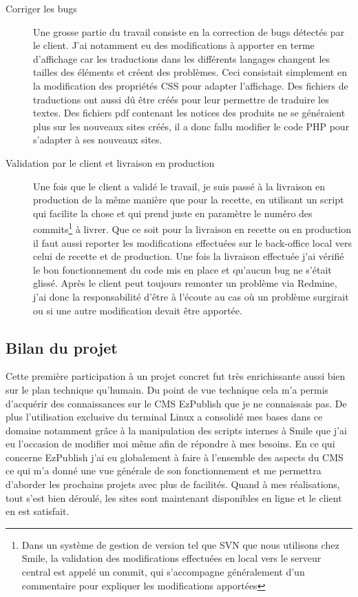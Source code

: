 \documentclass[a4paper,11pt,twoside]{report}
\begin{document}
\begin{description}
\begin{center}
	  \label{DDTH_home}
	\end{center}
	\item[Corriger les bugs] Une grosse partie du travail consiste en la correction de bugs détectés par le client. J'ai notamment eu des modifications à apporter en terme d'affichage car les traductions dans les différents langages changent les tailles des éléments et créent des problèmes. Ceci consistait simplement en la modification des propriétés CSS pour adapter l'affichage. Des fichiers de traductions ont aussi dû être créés pour leur permettre de traduire les textes. Des fichiers pdf contenant les notices des produits ne se généraient plus sur les nouveaux sites créés, il a donc fallu modifier le code PHP pour s'adapter à ses nouveaux sites. 
	\item[Validation par le client et livraison en production] Une fois que le client a validé le travail, je suis passé à la livraison en production de la même manière que pour la recette, en utilisant un script qui facilite la chose et qui prend juste en paramètre le numéro des commits\footnote{Dans un système de gestion de version tel que SVN que nous utilisons chez Smile, la validation des modifications effectuées en local vers le serveur central est appelé un commit, qui s'accompagne généralement d'un commentaire pour expliquer les modifications apportées} à livrer. Que ce soit pour la livraison en recette ou en production il faut aussi reporter les modifications effectuées sur le back-office local vers celui de recette et de production. Une fois la livraison effectuée j'ai vérifié le bon fonctionnement du code mis en place et qu'aucun bug ne s'était glissé. Après le client peut toujours remonter un problème via Redmine, j'ai donc la responsabilité d'être à l'écoute au cas où un problème surgirait ou si une autre modification devait être apportée.  
      
      \end{description}
    \subsection*{Bilan du projet}
    Cette première participation à un projet concret fut très enrichissante aussi bien sur le plan technique qu'humain. Du point de vue technique cela m'a permis d'acquérir des connaissances sur le CMS EzPublish que je ne connaissais pas. De plus l'utilisation exclusive du terminal Linux a consolidé mes bases dans ce domaine notamment grâce à la manipulation des scripts internes à Smile que j'ai eu l'occasion de modifier moi même afin de répondre à mes besoins. En ce qui concerne EzPublish j'ai eu globalement à faire à l'ensemble des aspects du CMS ce qui m'a donné une vue générale de son fonctionnement et me permettra d'aborder les prochains projets avec plus de facilités. Quand à mes réalisations, tout s'est bien déroulé, les sites sont maintenant disponibles en ligne et le client en est satisfait. 
    
\end{document}
